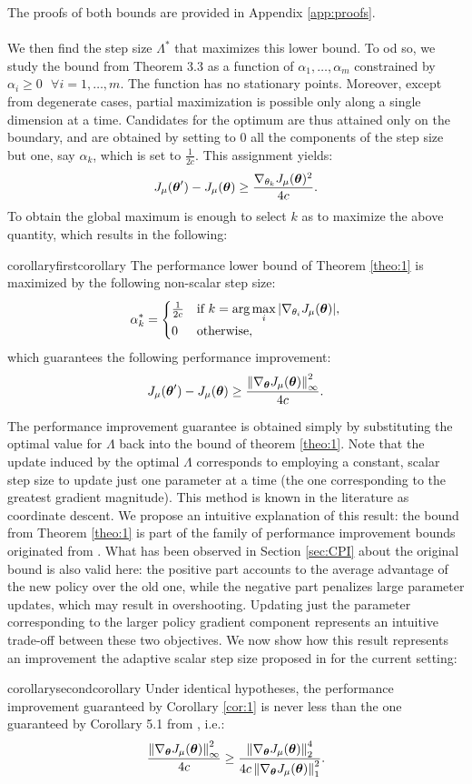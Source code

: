 The proofs of both bounds are provided in Appendix \ref{app:proofs}.
\paragraph{}
We then find the step size $\Lambda^*$ that maximizes this lower bound. To od so, we study the bound from Theorem 3.3 as a function of $\alpha_1,\dotsc,\alpha_m$ constrained by $\alpha_i \geq 0 \:\:\: \forall i=1,\dotsc,m$. The function has no stationary points. Moreover, except from degenerate cases, partial maximization is possible only along a single dimension at a time. Candidates for the optimum are thus attained only on the boundary, and are obtained by setting to $0$ all the components of the step size but one, say $\alpha_k$, which is set to $\frac{1}{2c}$.
This assignment yields:
\[
\DeltaJ \geq  \frac{\gradJ{\theta_k}^2}{4c}.
\]
To obtain the global maximum is enough to select $k$ as to maximize the above quantity, which results in the following:

\begin{restatable}{corollary}{firstcorollary}\label{cor:1}
The performance lower bound of Theorem \ref{theo:1} is maximized by the following non-scalar step size:
\[ \alpha_{k}^*=	
\begin{cases}
	\frac{1}
		{2c} & 
		\text{if } k = \arg\max\limits_i |\gradJ{\theta_i}|,	\\
		0 & \text{otherwise},
\end{cases}
\]
which guarantees the following performance improvement: 
\[
\DeltaJ \geq \frac{\norm[\infty]{\gradJ{\vtheta}}^2}{4c}.
\]
\end{restatable}
The performance improvement guarantee is obtained simply by substituting the optimal value for $\Lambda$ back into the bound of theorem  \ref{theo:1}.
Note that the update induced by the optimal $\Lambda$ corresponds to employing a constant, scalar step size to update just one parameter at a time (the one corresponding to the greatest gradient magnitude).
This method is known in the literature as coordinate descent.
We propose an intuitive explanation of this result: the bound from Theorem \ref{theo:1} is part of the family of performance improvement bounds originated from \cite{kakade2002approximately}. What has been observed in Section \ref{sec:CPI} about the original bound is also valid here: the positive part accounts to the average advantage of the new policy over the old one, while the negative part penalizes large parameter updates, which may result in overshooting. Updating just the parameter corresponding to the larger policy gradient component represents an intuitive trade-off between these two objectives.
We now show how this result represents an improvement \wrt the adaptive scalar step size proposed in \cite{NIPS2013_5186} for the current setting:
\begin{restatable}{corollary}{secondcorollary}\label{cor:2}
Under identical hypotheses, the performance improvement guaranteed by Corollary \ref*{cor:1} is never less than the one guaranteed by Corollary 5.1 from \cite{NIPS2013_5186}, i.e.:
\[
\frac{\norm[\infty]{\gradJ{\vtheta}}^2}
	{4c}
\geq
\frac{\norm[2]{\gradJ{\vtheta}}^4}
	{4c\norm[1]{\gradJ{\vtheta}}^2}.
\]
\end{restatable}

